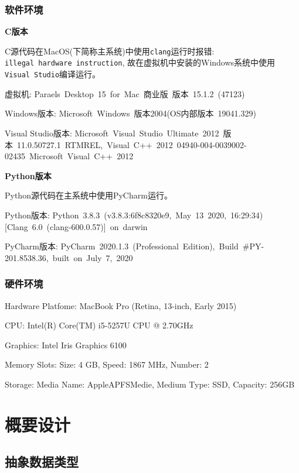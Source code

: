 \documentclass{ctexart}
\begin{document}
\subsubsection{软件环境}\label{header-n52}

\textbf{C版本}

C源代码在MacOS(下简称主系统)中使用\texttt{clang}运行时报错: \texttt{illegal\ hardware\ instruction}, 故在虚拟机中安装的Windows系统中使用\texttt{Visual\ Studio}编译运行。

虚拟机: Paraels\ Desktop\ 15\ for\ Mac\ 商业版\ 版本\ 15.1.2\ (47123)

Windows版本: Microsoft\ Windows\ 版本2004(OS内部版本\ 19041.329)

Visual Studio版本: Microsoft\ Visual\ Studio\ Ultimate\ 2012\ 版本\ 11.0.50727.1\ RTMREL,\ Visual\ C++\ 2012\ 04940-004-0039002-02435\ Microsoft\ Visual\ C++\ 2012

\textbf{Python版本}

Python源代码在主系统中使用PyCharm运行。

Python版本: Python\ 3.8.3\ (v3.8.3:6f8c8320e9,\ May\ 13\ 2020,\ 16:29:34){[}Clang\ 6.0\ (clang-600.0.57){]}\ on\ darwin

PyCharm版本: PyCharm\ 2020.1.3\ (Professional\ Edition),\ Build\ \#PY-201.8538.36,\ built\ on\ July\ 7,\ 2020

\subsubsection{硬件环境}\label{header-n62}

Hardware Platfome: MacBook Pro (Retina, 13-inch, Early 2015)

CPU: Intel(R) Core(TM) i5-5257U CPU @ 2.70GHz

Graphics: Intel Iris Graphics 6100

Memory Slots: Size: 4 GB, Speed: 1867 MHz, Number: 2

Storage: Media Name: AppleAPFSMedie, Medium Type: SSD, Capacity: 256GB


\section{概要设计}\label{header-n68}

\subsection{抽象数据类型}\label{header-n69}
\end{document}
